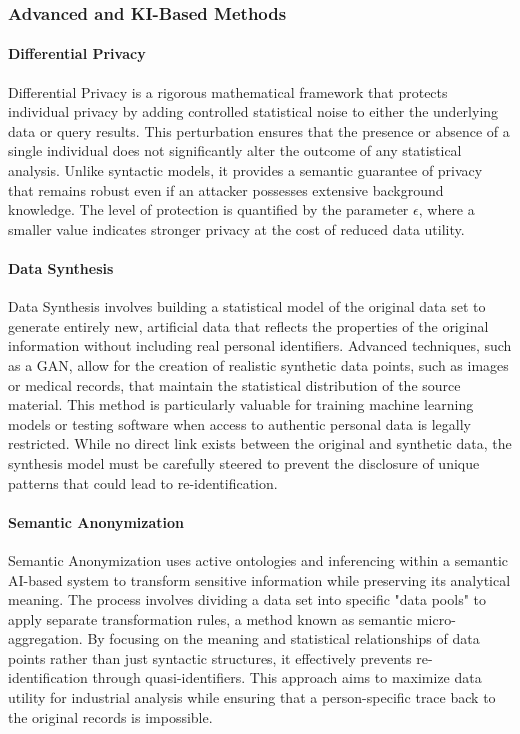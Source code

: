 \subsubsection{Advanced and KI-Based Methods}

\paragraph{Differential Privacy}
Differential Privacy is a rigorous mathematical framework that protects individual privacy by adding controlled statistical noise to either the underlying data or query results. This perturbation ensures that the presence or absence of a single individual does not significantly alter the outcome of any statistical analysis. Unlike syntactic models, it provides a semantic guarantee of privacy that remains robust even if an attacker possesses extensive background knowledge. The level of protection is quantified by the parameter $\epsilon$, where a smaller value indicates stronger privacy at the cost of reduced data utility.
\autocite[96--98]{Krebs2022}
\autocite[46--47]{gmdsbvd2024praxishilfe}

\paragraph{Data Synthesis}
Data Synthesis involves building a statistical model of the original data set to generate entirely new, artificial data that reflects the properties of the original information without including real personal identifiers. Advanced techniques, such as a \ac{GAN}, allow for the creation of realistic synthetic data points, such as images or medical records, that maintain the statistical distribution of the source material. This method is particularly valuable for training machine learning models or testing software when access to authentic personal data is legally restricted. While no direct link exists between the original and synthetic data, the synthesis model must be carefully steered to prevent the disclosure of unique patterns that could lead to re-identification.
\autocite[19, 99--101]{Krebs2022}
\autocite[34--35]{schwartmann2022praxisleitfaden}

\paragraph{Semantic Anonymization}
Semantic Anonymization uses active ontologies and inferencing within a semantic AI-based system to transform sensitive information while preserving its analytical meaning. The process involves dividing a data set into specific "data pools" to apply separate transformation rules, a method known as semantic micro-aggregation. By focusing on the meaning and statistical relationships of data points rather than just syntactic structures, it effectively prevents re-identification through quasi-identifiers. This approach aims to maximize data utility for industrial analysis while ensuring that a person-specific trace back to the original records is impossible.
\autocite[103--107]{Krebs2022}

